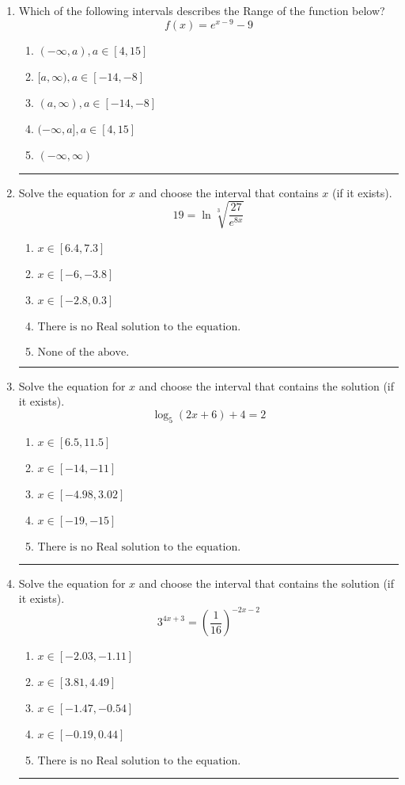 \documentclass[14pt]{extbook}
\newcommand{\litem}[1]{\item#1\hspace*{-1cm}\rule{\textwidth}{0.4pt}}
\begin{document}
\begin{enumerate}
{\begin{enumerate}[label=\Alph*.]
\end{enumerate} }
\litem{
Which of the following intervals describes the Range of the function below?\[ f(x) = e^{x-9}-9 \]\begin{enumerate}[label=\Alph*.]
\item \( (-\infty, a), a \in [4, 15] \)
\item \( [a, \infty), a \in [-14, -8] \)
\item \( (a, \infty), a \in [-14, -8] \)
\item \( (-\infty, a], a \in [4, 15] \)
\item \( (-\infty, \infty) \)

\end{enumerate} }
\litem{
 Solve the equation for $x$ and choose the interval that contains $x$ (if it exists).\[  19 = \ln{\sqrt[3]{\frac{27}{e^{8x}}}} \]\begin{enumerate}[label=\Alph*.]
\item \( x \in [6.4, 7.3] \)
\item \( x \in [-6, -3.8] \)
\item \( x \in [-2.8, 0.3] \)
\item \( \text{There is no Real solution to the equation.} \)
\item \( \text{None of the above.} \)

\end{enumerate} }
\litem{
Solve the equation for $x$ and choose the interval that contains the solution (if it exists).\[ \log_{5}{(2x+6)}+4 = 2 \]\begin{enumerate}[label=\Alph*.]
\item \( x \in [6.5, 11.5] \)
\item \( x \in [-14, -11] \)
\item \( x \in [-4.98, 3.02] \)
\item \( x \in [-19, -15] \)
\item \( \text{There is no Real solution to the equation.} \)

\end{enumerate} }
\litem{
Solve the equation for $x$ and choose the interval that contains the solution (if it exists).\[ 3^{4x+3} = \left(\frac{1}{16}\right)^{-2x-2} \]\begin{enumerate}[label=\Alph*.]
\item \( x \in [-2.03, -1.11] \)
\item \( x \in [3.81, 4.49] \)
\item \( x \in [-1.47, -0.54] \)
\item \( x \in [-0.19, 0.44] \)
\item \( \text{There is no Real solution to the equation.} \)


\end{enumerate}}
\end{enumerate}
\end{document}
